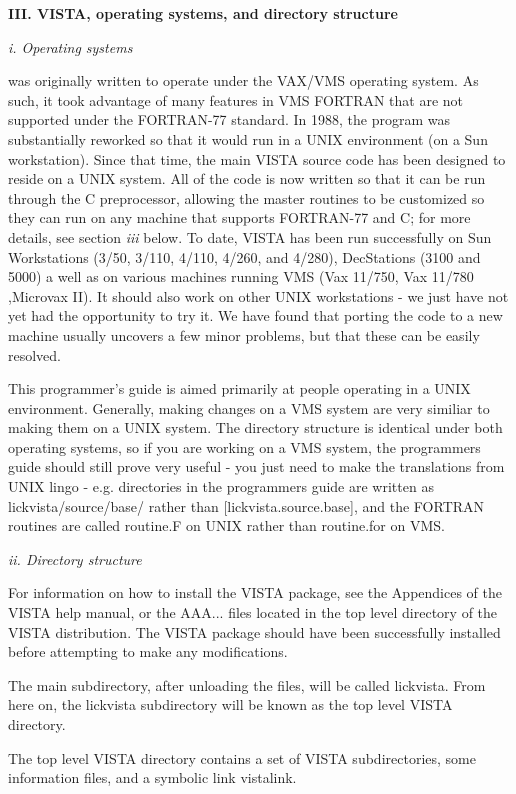 \Sskip
\centerline {\bf III.  VISTA, operating systems, and directory structure\rm}

\centerline{\it i. Operating systems}

	\V was originally written to operate under the VAX/VMS operating
system. As such, it took advantage of many features in VMS FORTRAN that are
not supported under the FORTRAN-77 standard.  In 1988, the program was
substantially reworked so that it would run in a UNIX environment (on a
Sun workstation).  Since that time, the main VISTA source code has been
designed to reside on a UNIX system.  All of the code is now written so
that it can be run through the C preprocessor, allowing the master routines
to be customized so they can run on any machine that supports FORTRAN-77 and
C; for more details, see section {\it iii} below.  
To date, VISTA has been run successfully on Sun Workstations (3/50,
3/110, 4/110, 4/260, and 4/280), DecStations (3100 and 5000) a well as on
various machines running VMS (Vax 11/750, Vax 11/780 ,Microvax II). 
It should also work on
other UNIX workstations - we just have not yet had the opportunity to try it.
We have found that porting the code to a new machine usually uncovers a few
minor problems, but that these can be easily resolved.

	This programmer's guide is aimed primarily at people operating
\V in a UNIX environment. Generally, making changes on a VMS system are
very similiar to making them on a UNIX system.  The directory structure
is identical under both operating systems, so if you are working on a VMS
system, the programmers guide should still prove very useful - you just
need to make the translations from UNIX lingo - e.g. directories in the
programmers guide are written as  lickvista/source/base/  rather than
[lickvista.source.base], and the FORTRAN routines are called   routine.F
on UNIX rather than routine.for on VMS.

\centerline{\it ii. Directory structure}

	For information on how to install the VISTA package, see the
Appendices of the VISTA help manual, or the AAA... files located in the
top level directory of the VISTA distribution. The VISTA package should
have been successfully installed before attempting to make any modifications.

     	The main subdirectory, after unloading the files, will be
called lickvista.  From here on, the lickvista subdirectory will be known as
the top level VISTA directory. 

    The top level VISTA directory contains a set of VISTA subdirectories, 
some information files, and a symbolic link vistalink.

